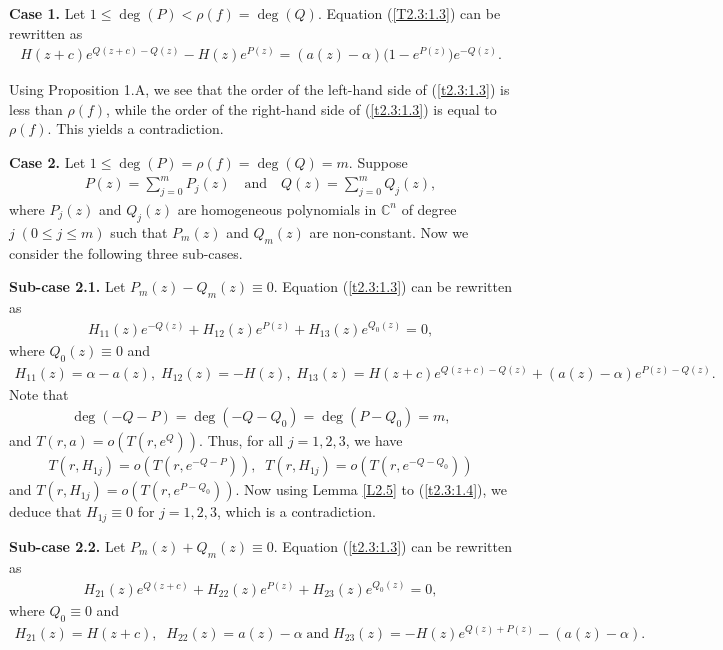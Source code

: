 \documentclass[11pt,reqno]{amsart}
\numberwithin{equation}{section}
\begin{document}
\medskip
\noindent
\textbf{Case 1.} Let $1 \le \deg(P) < \rho(f)=\deg(Q)$. Equation (\ref{T2.3:1.3}) can be rewritten as
\begin{align}\label{t2.3:1.3}
H(z+c)e^{Q(z+c)-Q(z)}-H(z)e^{P(z)}=(a(z)-\alpha)\bigl(1 - e^{P(z)}\bigr)e^{-Q(z)}.
\end{align}

Using Proposition 1.A, we see that the order of the left-hand side of (\ref{t2.3:1.3}) is less than $\rho(f)$, while the order of the right-hand side of (\ref{t2.3:1.3}) is equal to $\rho(f)$. This yields a contradiction.

\medskip
\noindent
\textbf{Case 2.} Let $1 \le \deg(P)=\rho(f)=\deg(Q)=m$. Suppose
\begin{align*}
P(z)=\sum\limits_{j=0}^m P_j(z)\quad \text{and}\quad Q(z)=\sum\limits_{j=0}^m Q_j(z),
\end{align*}
where $P_j(z)$ and $Q_j(z)$ are homogeneous polynomials in $\mathbb{C}^n$ of degree $j\;(0\le j\le m)$ such that $P_m(z)$ and $Q_m(z)$ are non-constant.
Now we consider the following three sub-cases.

\medskip
\noindent
\textbf{Sub-case 2.1.} Let $P_m(z)-Q_m(z)\equiv 0$. Equation (\ref{t2.3:1.3}) can be rewritten as
\begin{align}\label{t2.3:1.4}
H_{11}(z)e^{-Q(z)} + H_{12}(z)e^{P(z)} + H_{13}(z)e^{Q_{0}(z)}=0,
\end{align}
where $Q_{0}(z)\equiv 0$ and
\begin{align*}
H_{11}(z) = \alpha - a(z),\; H_{12}(z) = -H(z),\;
H_{13}(z)= H(z+c)e^{Q(z+c)-Q(z)} + (a(z)-\alpha)e^{P(z)-Q(z)}.
\end{align*}
Note that
\begin{align*}
\deg(-Q-P)= \deg(-Q-Q_{0})= \deg(P-Q_{0})=m,
\end{align*}
and $T(r,a)=o(T(r,e^{Q})).$
Thus, for all $j = 1,2,3$, we have
\begin{align*}
T(r,H_{1j})= o\left(T\left(r,e^{-Q-P}\right)\right),\;\; T(r,H_{1j})= o\left(T\left(r,e^{-Q-Q_{0}}\right)\right)
\end{align*}
and $T(r,H_{1j})= o\left(T\left(r,e^{P-Q_{0}}\right)\right).$
Now using Lemma \ref{L2.5} to (\ref{t2.3:1.4}), we deduce that $H_{1j}\equiv 0$ for $j = 1,2,3$, which is a contradiction.

\medskip
\noindent
\textbf{Sub-case 2.2.} Let $P_m(z)+Q_m(z)\equiv 0$. Equation (\ref{t2.3:1.3}) can be rewritten as
\begin{align*}
H_{21}(z)e^{Q(z+c)} + H_{22}(z)e^{P(z)} + H_{23}(z)e^{Q_{0}(z)} = 0,
\end{align*}
where $Q_{0}\equiv 0$ and
\begin{align*}
H_{21}(z) = H(z+c),\;\;H_{22}(z) = a(z) - \alpha\;\text{and}\; H_{23}(z) = -H(z)e^{Q(z)+P(z)} - (a(z)-\alpha).
\end{align*}
\end{document}
